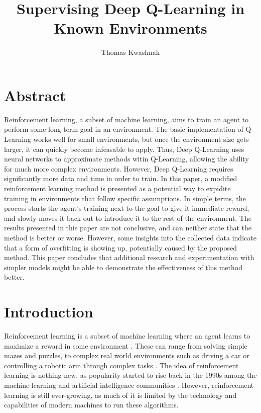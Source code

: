 \documentclass[12pt,letterpaper]{article}
\author{Thomas Kwashnak}
\title{Supervising Deep Q-Learning in Known Environments}
\begin{document}
\maketitle

\newpage

\section{Abstract}

Reinforcement learning, a subset of machine learning, aims to train an agent to perform some long-term goal in an environment.
The basic implementation of Q-Learning works well for small environments, but once the environment size gets larger, it can quickly become infeasable to apply.
Thus, Deep Q-Learning uses neural networks to approximate methods witin Q-Learning, allowing the ability for much more complex environments.
However, Deep Q-Learning requires significantly more data and time in order to train.
In this paper, a modified reinforcement learning method is presented as a potential way to expidite training in environments that follow specific assumptions.
In simple terms, the process starts the agent's training next to the goal to give it immediate reward, and slowly moves it back out to introduce it to the rest of the environment.
The results presented in this paper are not conclusive, and can neither state that the method is better or worse.
However, some insights into the collected data indicate that a form of overfitting is showing up, potentially caused by the proposed method.
This paper concludes that additional research and experimentation with simpler models might be able to demonstrate the effectiveness of this method better.

\section{Introduction}

Reinforcement learning is a subset of machine learning where an agent learns to maximize a reward in some environment \cite{article_reinforcement_learning_survey}.
These can range from solving simple mazes and puzzles, to complex real world environments such as driving a car or controlling a robotic arm through complex tasks \cite{article_deep_learning_hybrid_quantum}.
The idea of reinforcement learning is nothing new, as popularity started to rise back in the 1990s among the machine learning and artificial intelligence communities \cite{article_reinforcement_learning_survey}.
However, reinforcement learning is still ever-growing, as much of it is limited by the technology and capabilities of modern machines to run these algorithms.
\end{document}
